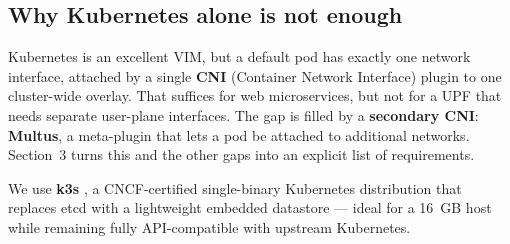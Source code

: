 \subsection{Why Kubernetes alone is not enough}

Kubernetes is an excellent VIM, but a default pod has exactly one network
interface, attached by a single \textbf{CNI} (Container Network Interface)
plugin to one cluster-wide overlay. That suffices for web microservices, but
not for a UPF that needs separate user-plane interfaces. The gap is filled by
a \textbf{secondary CNI}: \textbf{Multus}, a meta-plugin that lets a pod be
attached to additional networks. Section~3 turns this and the other gaps into
an explicit list of requirements.

We use \textbf{k3s} \cite{k3s}, a CNCF-certified single-binary Kubernetes
distribution that replaces etcd with a lightweight embedded datastore --- ideal
for a 16~GB host while remaining fully API-compatible with upstream Kubernetes.
